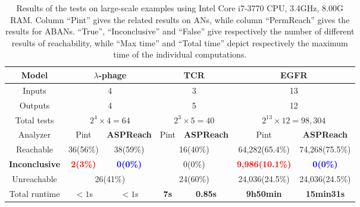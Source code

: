 \documentclass[runningheads]{llncs}
\begin{document}

\begin{table}[ht]
\centering
    \begin{tabular}{|c|c|c|c|c|c|c|}
    \hline
  	Model	&\multicolumn{2}{c|}{$\lambda$-phage}	&	  \multicolumn{2}{c|}{TCR} & \multicolumn{2}{c|}{EGFR}  \\
    \hline
    Inputs&\multicolumn{2}{c|}{4}	&	  \multicolumn{2}{c|}{3} & \multicolumn{2}{c|}{13}\\
    \hline
    Outputs&\multicolumn{2}{c|}{4} &	  \multicolumn{2}{c|}{5} & \multicolumn{2}{c|}{12} \\
    \hline
    Total tests&\multicolumn{2}{c|}{$2^4\times 4=64$} & \multicolumn{2}{c|}{$2^3\times 5=40$} & \multicolumn{2}{c|}{$2^{13}\times 12=98,304$}\\
    \hline
    Analyzer  &  Pint       &\textbf{ASPReach}    &  Pint       &\textbf{ASPReach}   &  Pint       &\textbf{ASPReach}             \\
    \hline
    Reachable    & 36(56\%)& 38(59\%)   &  \multicolumn{2}{c|}{16(40\%)}  & 64,282(65.4\%)&74,268(75.5\%)\\
    \hline
    \textbf{Inconclusive} & \textcolor{red}{\textbf{2(3\%)}}&\textcolor{blue}{\textbf{0(0\%)}}& \multicolumn{2}{c|}{0(0\%)}    &\textcolor{red}{\textbf{9,986(10.1\%)}}&\textcolor{blue}{\textbf{0(0\%)}}  \\
    \hline
    Unreachable     &  \multicolumn{2}{c|}{26(41\%)} &  \multicolumn{2}{c|}{24(60\%)} &24,036(24.5\%)&24,036(24.5\%)\\
    \hline
    Total runtime &  $<1$s       &  $<1$s &  \textbf{7s}       &  \textbf{0.85s}        & \textbf{9h50min}              & \textbf{15min31s}      \\
    \hline
    \end{tabular}
\caption{Results of the tests on large-scale examples using Intel Core i7-3770 CPU, \@3.4GHz, 8.00G RAM. 
Column “Pint” gives the related results on ANs, while column “PermReach” gives the results for ABANs. 
“True”, “Inconclusive” and “False” give respectively the number of different results of reachability, while “Max time” and “Total time” depict respectively the maximum time of the individual computations.}
\label{tab:2}
\end{table}
\end{document}
